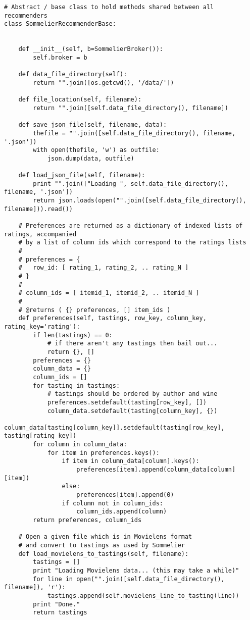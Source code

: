 \begin{verbatim}
# Abstract / base class to hold methods shared between all recommenders
class SommelierRecommenderBase:


    def __init__(self, b=SommelierBroker()):
        self.broker = b

    def data_file_directory(self):
        return "".join([os.getcwd(), '/data/'])

    def file_location(self, filename):
        return "".join([self.data_file_directory(), filename])

    def save_json_file(self, filename, data):
        thefile = "".join([self.data_file_directory(), filename, '.json'])
        with open(thefile, 'w') as outfile:
            json.dump(data, outfile)

    def load_json_file(self, filename):
        print "".join(["Loading ", self.data_file_directory(), filename, '.json'])
        return json.loads(open("".join([self.data_file_directory(), filename])).read())

    # Preferences are returned as a dictionary of indexed lists of ratings, accompanied
    # by a list of column ids which correspond to the ratings lists
    #
    # preferences = {
    #   row_id: [ rating_1, rating_2, .. rating_N ]
    # }
    #
    # column_ids = [ itemid_1, itemid_2, .. itemid_N ]
    #
    # @returns ( {} preferences, [] item_ids )
    def preferences(self, tastings, row_key, column_key, rating_key='rating'):
        if len(tastings) == 0:
            # if there aren't any tastings then bail out...
            return {}, []
        preferences = {}
        column_data = {}
        column_ids = []
        for tasting in tastings:
            # tastings should be ordered by author and wine
            preferences.setdefault(tasting[row_key], [])
            column_data.setdefault(tasting[column_key], {})
            column_data[tasting[column_key]].setdefault(tasting[row_key], tasting[rating_key])
        for column in column_data:
            for item in preferences.keys():
                if item in column_data[column].keys():
                    preferences[item].append(column_data[column][item])
                else:
                    preferences[item].append(0)
                if column not in column_ids:
                    column_ids.append(column)
        return preferences, column_ids

    # Open a given file which is in Movielens format
    # and convert to tastings as used by Sommelier
    def load_movielens_to_tastings(self, filename):
        tastings = []
        print "Loading Movielens data... (this may take a while)"
        for line in open("".join([self.data_file_directory(), filename]), 'r'):
            tastings.append(self.movielens_line_to_tasting(line))
        print "Done."
        return tastings
            

\end{verbatim}
